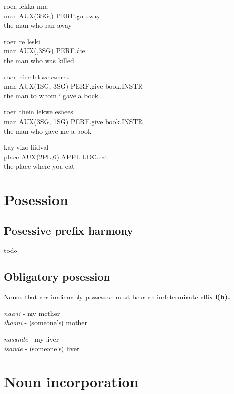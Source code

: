 \documentclass[9pt]{amsart}
\begin{document}
\begin{exe}
\ex
\gll roen \auxthreesg lekka nna \\
 man AUX(3SG,) PERF.go away \\
\trans the man who ran away

\ex
\gll roen re leski \\
man AUX(,3SG) PERF.die \\
\trans the man who was killed


\ex
\gll roen nire lekwe eshees \\
man AUX(1SG, 3SG) PERF.give book.INSTR \\
\trans the man to whom i gave a book

\ex
\gll roen thein lekwe eshees \\
man AUX(3SG, 1SG) PERF.give book.INSTR \\
\trans the man who gave me a book

\ex
\gll kay vizo liidval \\
place AUX(2PL,6) APPL-LOC.eat \\
\trans the place where you eat
\end{exe}


\section{Posession}

\subsection{Posessive prefix harmony}

todo

\subsection{Obligatory posession}

Nouns that are inalienably possessed must bear an indeterminate affix \textbf{i(h)-}

\begin{exe}
\ex \textit{naani} - my mother \\
 \textit{ihaani} - (someone's) mother

\ex \textit{nasande} - my liver \\
 \textit{isande} - (someone's) liver

\end{exe}


\section{Noun incorporation}
\end{document}
